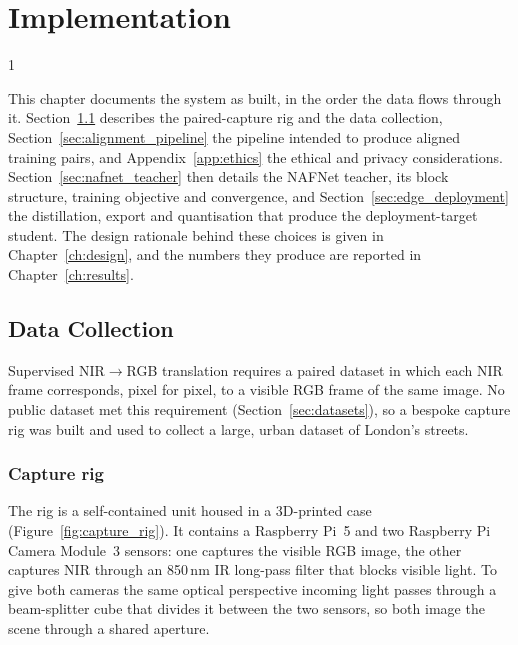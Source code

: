 \doublespacing %

\chapter{Implementation}
\label{ch:implementation}

\begin{spacing}{1} %
\minitoc %
\end{spacing} %
\thesisspacing %

This chapter documents the system as built, in the order the data flows through it. Section~\ref{sec:data_collection_pi} describes the paired-capture rig and the data collection, Section~\ref{sec:alignment_pipeline} the pipeline intended to produce aligned training pairs, and Appendix~\ref{app:ethics} the ethical and privacy considerations. Section~\ref{sec:nafnet_teacher} then details the NAFNet teacher, its block structure, training objective and convergence, and Section~\ref{sec:edge_deployment} the distillation, export and quantisation that produce the deployment-target student. The design rationale behind these choices is given in Chapter~\ref{ch:design}, and the numbers they produce are reported in Chapter~\ref{ch:results}.

\section{Data Collection}
\label{sec:data_collection_pi}

Supervised NIR$\rightarrow$RGB translation requires a paired dataset in which each NIR frame corresponds, pixel for pixel, to a visible RGB frame of the same image. No public dataset met this requirement (Section~\ref{sec:datasets}), so a bespoke capture rig was built and used to collect a large, urban dataset of London's streets.

\subsection{Capture rig}
\label{sec:hardware_setup}

The rig is a self-contained unit housed in a 3D-printed case (Figure~\ref{fig:capture_rig}). It contains a Raspberry Pi~5 and two Raspberry Pi Camera Module~3 sensors: one captures the visible RGB image, the other captures NIR through an 850\,nm IR long-pass filter that blocks visible light. To give both cameras the same optical perspective incoming light passes through a beam-splitter cube that divides it between the two sensors, so both image the scene through a shared aperture.

